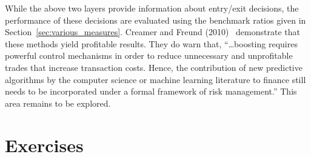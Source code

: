 While the above two layers provide information about entry/exit decisions, the performance of these decisions are evaluated using the benchmark ratios given in Section~\ref{sec:various_measures}. Creamer and Freund (2010)~\cite{creamer2010} demonstrate that these methods yield profitable results. They do warn that, ``\dots boosting requires powerful control mechanisms in order to reduce unnecessary and unprofitable trades that increase transaction costs. Hence, the contribution of new predictive algorithms by the computer science or machine learning literature to finance still needs to be incorporated under a formal framework of risk management.'' This area remains to be explored. 



\section{Exercises}


